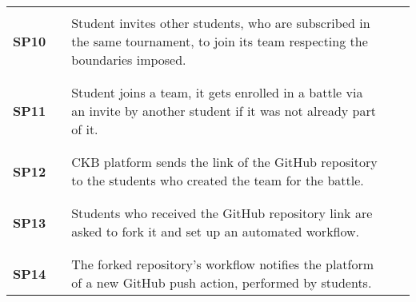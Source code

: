 \begin{longtable}[H]{l l p{8.5cm} l l}
                   &        &                                                                                                                                   &        &                        \\\hline & & \\
    \textbf{SP10}  & \vline & Student invites other students, who are subscribed in the same tournament, to join its team respecting the boundaries imposed.    & \vline &                        \\
                   &        &                                                                                                                                   &        &                        \\\hline & & \\
    \textbf{SP11}  & \vline & Student joins a team, it gets enrolled in a battle via an invite by another student if it was not already part of it.             & \vline &                        \\
                   &        &                                                                                                                                   &        &                        \\\hline & & \\
    \textbf{SP12}  & \vline & CKB platform sends the link of the GitHub repository to the students who created the team for the battle.                         & \vline &                        \\
                   &        &                                                                                                                                   &        &                        \\\hline & & \\
    \textbf{SP13}  & \vline & Students who received the GitHub repository link are asked to fork it and set up an automated workflow.                           & \vline &                        \\
                   &        &                                                                                                                                   &        &                        \\\hline & & \\
    \textbf{SP14}  & \vline & The forked repository's workflow notifies the platform of a new GitHub push action, performed by students.                        & \vline &                        \\

\end{longtable}
